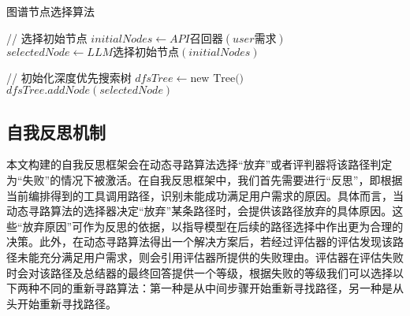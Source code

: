 \begin{algorithm}[htb]
    \caption{图谱节点选择算法}
    \label{algo:algorithm}
    \small
    \SetAlgoLined
  
    // 选择初始节点\;
    $initialNodes \gets API召回器(user需求)$\;
    $selectedNode \gets LLM选择初始节点(initialNodes)$\;
    
    // 初始化深度优先搜索树\;
    $dfsTree \gets \text{new Tree()}$\;
    $dfsTree.addNode(selectedNode)$\;
  
  \end{algorithm}

\subsection{自我反思机制}

本文构建的自我反思框架会在动态寻路算法选择“放弃”或者评判器将该路径判定为“失败”的情况下被激活。在自我反思框架中，我们首先需要进行“反思”，即根据当前编排得到的工具调用路径，识别未能成功满足用户需求的原因。具体而言，当动态寻路算法的选择器决定“放弃”某条路径时，会提供该路径放弃的具体原因。这些“放弃原因”可作为反思的依据，以指导模型在后续的路径选择中作出更为合理的决策。此外，在动态寻路算法得出一个解决方案后，若经过评估器的评估发现该路径未能充分满足用户需求，则会引用评估器所提供的失败理由。评估器在评估失败时会对该路径及总结器的最终回答提供一个等级，根据失败的等级我们可以选择以下两种不同的重新寻路算法：第一种是从中间步骤开始重新寻找路径，另一种是从头开始重新寻找路径。

